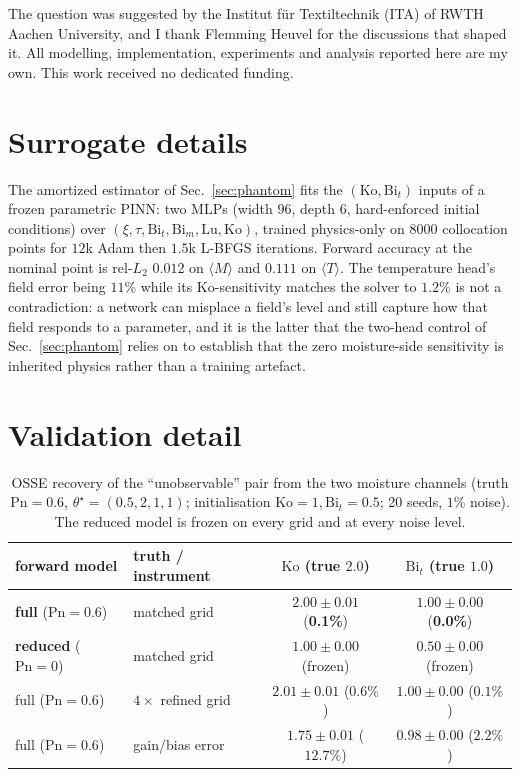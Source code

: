 \documentclass{article}
\begin{document}
\begin{ack}
The question was suggested by the Institut f\"ur Textiltechnik (ITA) of RWTH Aachen University, and
I thank Flemming Heuvel for the discussions that shaped it. All modelling, implementation,
experiments and analysis reported here are my own. This work received no dedicated funding.
\end{ack}

{\small}

\newpage


\appendix
\section{Surrogate details}\label{app:surrogate}
The amortized estimator of Sec.~\ref{sec:phantom} fits the $(\mathrm{Ko},\mathrm{Bi}_t)$ inputs of a
frozen parametric PINN: two MLPs (width $96$, depth $6$, hard-enforced initial conditions) over
$(\xi,\tau,\mathrm{Bi}_t,\mathrm{Bi}_m,\mathrm{Lu},\mathrm{Ko})$, trained physics-only on $8000$
collocation points for $12$k Adam then $1.5$k L-BFGS iterations. Forward accuracy at the nominal
point is rel-$L_2$ $0.012$ on $\langle M\rangle$ and $0.111$ on $\langle T\rangle$. The temperature
head's field error being $11\%$ while its $\mathrm{Ko}$-sensitivity matches the solver to $1.2\%$ is
not a contradiction: a network can misplace a field's level and still capture how that field responds
to a parameter, and it is the latter that the two-head control of Sec.~\ref{sec:phantom} relies on to
establish that the zero moisture-side sensitivity is inherited physics rather than a training
artefact.

\section{Validation detail}\label{app:valid}
\begin{table}[!htbp]\centering\small
\caption{OSSE recovery of the ``unobservable'' pair from the two moisture channels (truth
$\mathrm{Pn}{=}0.6$, $\theta^\star{=}(0.5,2,1,1)$; initialisation $\mathrm{Ko}{=}1,\mathrm{Bi}_t{=}0.5$;
20 seeds, $1\%$ noise). The reduced model is frozen on every grid and at every noise level.}
\label{tab:osse}
\begin{tabular}{llcc}\toprule
forward model & truth / instrument & $\mathrm{Ko}$ (true $2.0$) & $\mathrm{Bi}_t$ (true $1.0$)\\\midrule
\textbf{full} ($\mathrm{Pn}{=}0.6$) & matched grid & $2.00\!\pm\!0.01$ (\textbf{0.1\%}) & $1.00\!\pm\!0.00$ (\textbf{0.0\%})\\
\textbf{reduced} ($\mathrm{Pn}{=}0$) & matched grid & $1.00\!\pm\!0.00$ (frozen) & $0.50\!\pm\!0.00$ (frozen)\\
full ($\mathrm{Pn}{=}0.6$) & $4\times$ refined grid & $2.01\!\pm\!0.01$ ($0.6\%$) & $1.00\!\pm\!0.00$ ($0.1\%$)\\
full ($\mathrm{Pn}{=}0.6$) & gain/bias error & $1.75\!\pm\!0.01$ ($12.7\%$) & $0.98\!\pm\!0.00$ ($2.2\%$)\\
\bottomrule\end{tabular}
\end{table}
\end{document}
